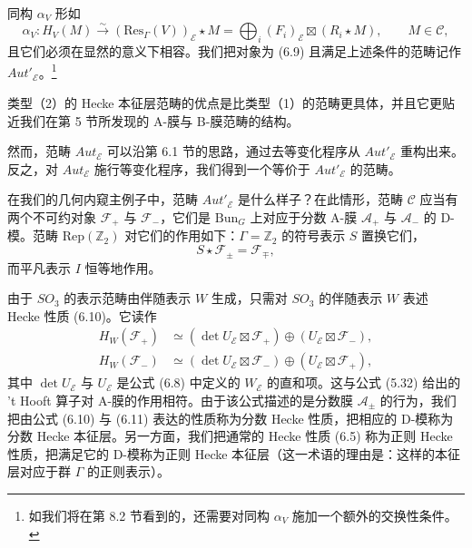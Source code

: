 \documentclass[11pt,a4paper]{article}
\newcommand{\Bun}{\mathrm{Bun}}
\begin{document}

同构 $\alpha_V$ 形如
\begin{equation}\tag{6.10}
\alpha_V : H_V(M)\xrightarrow{\sim}(\mathrm{Res}_\Gamma(V))_{\mathcal{E}}\star M = \bigoplus_i(F_i)_{\mathcal{E}}\boxtimes(R_i\star M),\qquad M\in\mathcal{C},
\end{equation}
且它们必须在显然的意义下相容。我们把对象为 (6.9) 且满足上述条件的范畴记作 $Aut'_{\mathcal{E}}$。\footnote{如我们将在第 8.2 节看到的，还需要对同构 $\alpha_V$ 施加一个额外的交换性条件。}


类型（2）的 Hecke 本征层范畴的优点是比类型（1）的范畴更具体，并且它更贴近我们在第 5 节所发现的 A-膜与 B-膜范畴的结构。

然而，范畴 $Aut_{\mathcal{E}}$ 可以沿第 6.1 节的思路，通过去等变化程序从 $Aut'_{\mathcal{E}}$ 重构出来。反之，对 $Aut_{\mathcal{E}}$ 施行等变化程序，我们得到一个等价于 $Aut'_{\mathcal{E}}$ 的范畴。

在我们的几何内窥主例子中，范畴 $Aut'_{\mathcal{E}}$ 是什么样子？在此情形，范畴 $\mathcal{C}$ 应当有两个不可约对象 $\mathcal{F}_+$ 与 $\mathcal{F}_-$，它们是 $\Bun_G$ 上对应于分数 A-膜 $\mathcal{A}_+$ 与 $\mathcal{A}_-$ 的 D-模。范畴 $\mathrm{Rep}(\mathbb{Z}_2)$ 对它们的作用如下：$\Gamma = \mathbb{Z}_2$ 的符号表示 $S$ 置换它们，
\[
S\star\mathcal{F}_\pm = \mathcal{F}_\mp,
\]
而平凡表示 $I$ 恒等地作用。

由于 $SO_3$ 的表示范畴由伴随表示 $W$ 生成，只需对 $SO_3$ 的伴随表示 $W$ 表述 Hecke 性质 (6.10)。它读作
\begin{equation}\tag{6.11}
\begin{aligned}
H_W(\mathcal{F}_+) &\simeq (\det U_{\mathcal{E}}\boxtimes\mathcal{F}_+)\oplus(U_{\mathcal{E}}\boxtimes\mathcal{F}_-),\\
H_W(\mathcal{F}_-) &\simeq (\det U_{\mathcal{E}}\boxtimes\mathcal{F}_-)\oplus(U_{\mathcal{E}}\boxtimes\mathcal{F}_+),
\end{aligned}
\end{equation}
其中 $\det U_{\mathcal{E}}$ 与 $U_{\mathcal{E}}$ 是公式 (6.8) 中定义的 $W_{\mathcal{E}}$ 的直和项。这与公式 (5.32) 给出的 't Hooft 算子对 A-膜的作用相符。由于该公式描述的是分数膜 $\mathcal{A}_\pm$ 的行为，我们把由公式 (6.10) 与 (6.11) 表达的性质称为分数 Hecke 性质，把相应的 D-模称为分数 Hecke 本征层。另一方面，我们把通常的 Hecke 性质 (6.5) 称为正则 Hecke 性质，把满足它的 D-模称为正则 Hecke 本征层（这一术语的理由是：这样的本征层对应于群 $\Gamma$ 的正则表示）。
\end{document}
